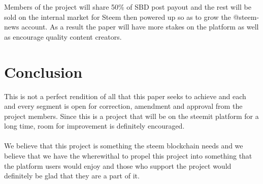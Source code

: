 \documentclass[a4paper,12pt]{article}
\newcommand{\sectionbreak}{\clearpage}
\begin{document}
\noindent
Members of the project will share 50\% of SBD post payout and the rest will be sold on the internal market for Steem then powered up so as to grow the @steem-news account.  As a result the paper will have more stakes on the platform as well as encourage quality content creators.

\sectionbreak   

\section{Conclusion}

This is not a perfect rendition of all that this paper seeks to achieve and each and every segment is open for correction, amendment and approval from the project members. Since this is a project that will be on the steemit platform for a long time, room for improvement is definitely encouraged. 
\\\\
We believe that this project is something the steem blockchain needs and we believe that we have the wherewithal to propel this project into something that the platform users would enjoy and those who support the project would definitely be glad that they are a part of it. 

\end{document}
